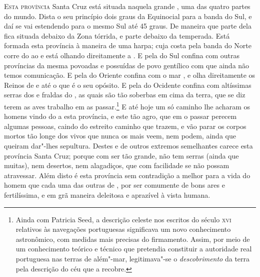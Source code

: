 \noindent\textsc{Esta província} Santa Cruz está situada naquela grande , uma das     
quatro partes do mundo. Dista o seu princípio dois graus da Equinocial				     %
para a banda do Sul, e daí se vai estendendo para o mesmo Sul até
45 graus. De maneira que parte dela fica situada debaixo
da Zona tórrida, e parte debaixo da temperada. Está formada esta
província à maneira de uma harpa; cuja costa pela banda do Norte corre
do  ao  e está olhando direitamente a . E pela
do Sul confina com outras províncias da mesma  povoadas e
possuídas de povo gentílico com que ainda não temos comunicação. E pela 		%
do Oriente confina com o mar , e olha direitamente os
Reinos de  e  até o  que é o seu
opósito. E pela do Ocidente confina com altíssimas serras dos  e
fraldas do , as quais são tão soberbas em cima da terra, que se diz
terem as aves trabalho em as passar.\footnote{ Ainda com Patricia Seed,
a descrição celeste nos escritos do século \textsc{xvi} relativos às navegações
portuguesas significava um novo conhecimento astronômico, com medidas
mais precisas do firmamento. Assim, por meio de um conhecimento teórico
e técnico que pretendia constituir a autoridade real portuguesa nas
terras de além"-mar, legitimava"-se o \textit{descobrimento} da terra
pela descrição do céu que a recobre.} E até hoje um
só caminho lhe acharam os homens vindo do  a esta província, e este
tão agro, que em o passar perecem algumas pessoas, caindo do estreito			%
caminho que trazem, e vão parar os corpos mortos tão longe dos vivos
que nunca os mais veem, nem podem, ainda que queiram dar"-lhes sepultura.
Destes e de outros extremos semelhantes carece esta província Santa			%
Cruz; porque com ser tão grande, não tem serras (ainda que muitas), nem
desertos, nem alagadiços, que com facilidade se não possam atravessar.
Além disto é esta província sem contradição a melhor para a vida do
homem que cada uma das outras de , por ser comumente de bons ares
e fertilíssima, e em grã maneira deleitosa e aprazível à vista
humana.

